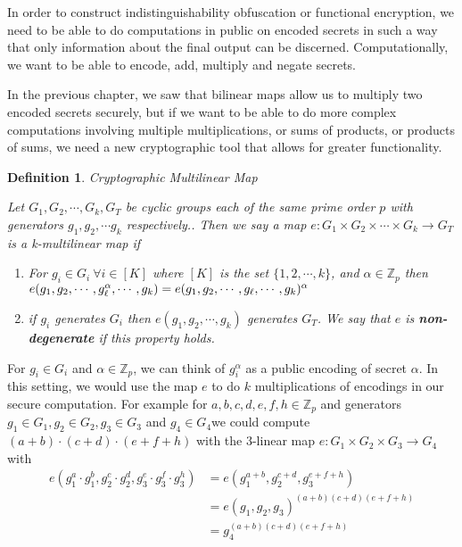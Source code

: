 \documentclass[12pt,twoside]{reedthesis}
\newtheorem{definition}{Definition}
\newcommand{\Z}[0]{\mathbb{Z}}
\begin{document}
    In order to construct indistinguishability obfuscation or functional encryption, we need to be able to do computations in public on encoded secrets in such a way that only information about the final output can be discerned. Computationally, we want to be able to encode, add, multiply and negate secrets. 
    \par In the previous chapter, we saw that bilinear maps allow us to multiply two encoded secrets securely, but if we want to be able to do more complex computations involving multiple multiplications, or sums of products, or products of sums, we need a new cryptographic tool that allows for greater functionality.
    \begin{definition}{Cryptographic Multilinear Map}
    \par Let $G_1,G_2, \cdots, G_k,G_T$ be cyclic groups each of the same prime order $p$ with generators $g_1,g_2,\cdots g_k$ respectively.. Then we say a map $e:G_1 \times G_2 \times \cdots \times G_k \rightarrow G_T$ is a k-multilinear map if
    
    \begin{enumerate}
    \item For $g_i \in G_i \: \forall i \in [K]$ where $[K]$ is the set $\{1,2,\cdots,k \}$, and $\alpha \in \mathbb{Z}_p$ then $e(g_1, g_2, \cdots,g_\ell^\alpha , \cdots , g_k) =e(g_1, g_2, \cdots, g_\ell , \cdots , g_k)^\alpha \\$
    \item if $g_i$ generates $G_i$ then $e(g_1,g_2,\cdots , g_k)$ generates $G_T$. We say that $e$ is \textbf{non-degenerate} if this property holds.
    \end{enumerate}
    \end{definition}
       
       For $g_i \in G_i$ and $\alpha \in \Z_p$, we can think of $g_i^\alpha$ as a public encoding of secret $\alpha$. In this setting, we would use the map $e$ to do $k$ multiplications of encodings in our secure computation. For example for $a,b,c,d,e,f,h \in \Z_p$ and generators $g_1 \in G_1, g_2\in G_2, g_3\in G_3$ and $g_4 \in G_4$we could compute $(a+b)\cdot(c+d)\cdot(e+f+h)$ with the $3$-linear map $e:G_1\times G_2 \times G_3 \to G_4$ with 
 \begin{align*}      
 e(g_1^a \cdot g_1^b,g_2^c\cdot g_2^d,g_3^e\cdot g_3^f \cdot g_3^h)&=e(g_1^{a +b},g_2^{c+d},g_3^{e+f+h})\\
 &= e(g_1,g_2,g_3)^{(a+b)(c+d)(e+f+h)} \\
 &=g_4^{(a+b)(c+d)(e+f+h)}
 \end{align*}
 
\end{document}
